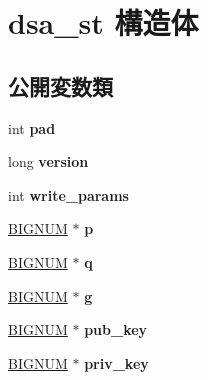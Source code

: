 \hypertarget{structdsa__st}{}\section{dsa\+\_\+st 構造体}
\label{structdsa__st}
\subsection*{公開変数類}
\begin{DoxyCompactItemize}
\item 
\hypertarget{structdsa__st_abdf71672c40a2cd7d02bc8f86f33d3c9}{}int {\bfseries pad}\label{structdsa__st_abdf71672c40a2cd7d02bc8f86f33d3c9}

\item 
\hypertarget{structdsa__st_a9aa35c728a9166c0671f4286f7f367cc}{}long {\bfseries version}\label{structdsa__st_a9aa35c728a9166c0671f4286f7f367cc}

\item 
\hypertarget{structdsa__st_a4b48d1347fa55e2f68cc991d98c2daf2}{}int {\bfseries write\+\_\+params}\label{structdsa__st_a4b48d1347fa55e2f68cc991d98c2daf2}

\item 
\hypertarget{structdsa__st_a63246fbe0fc27945bd32765e5538a1a6}{}\hyperlink{structbignum__st}{B\+I\+G\+N\+U\+M} $\ast$ {\bfseries p}\label{structdsa__st_a63246fbe0fc27945bd32765e5538a1a6}

\item 
\hypertarget{structdsa__st_ab0cae8e320e604e2f4d18066bb02a097}{}\hyperlink{structbignum__st}{B\+I\+G\+N\+U\+M} $\ast$ {\bfseries q}\label{structdsa__st_ab0cae8e320e604e2f4d18066bb02a097}

\item 
\hypertarget{structdsa__st_af5ec97a996fd695c0186eb5a9a2b0b38}{}\hyperlink{structbignum__st}{B\+I\+G\+N\+U\+M} $\ast$ {\bfseries g}\label{structdsa__st_af5ec97a996fd695c0186eb5a9a2b0b38}

\item 
\hypertarget{structdsa__st_a2a844d480ca7c1a73dadeee215863fa6}{}\hyperlink{structbignum__st}{B\+I\+G\+N\+U\+M} $\ast$ {\bfseries pub\+\_\+key}\label{structdsa__st_a2a844d480ca7c1a73dadeee215863fa6}

\item 
\hypertarget{structdsa__st_a42c62516432a22cae5b2092c8276deaa}{}\hyperlink{structbignum__st}{B\+I\+G\+N\+U\+M} $\ast$ {\bfseries priv\+\_\+key}\label{structdsa__st_a42c62516432a22cae5b2092c8276deaa}


\end{DoxyCompactItemize}

